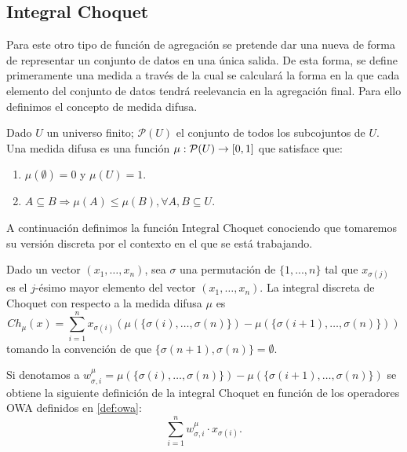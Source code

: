 \subsection{Integral Choquet}
Para este otro tipo de función \cite{art:choquet, art:sugenochoquet} de agregación se pretende dar una nueva de forma de representar un conjunto de datos en una única salida. De esta forma, se define primeramente una medida a través de la cual se calculará la forma en la que cada elemento del conjunto de datos tendrá reelevancia en la agregación final. Para ello definimos el concepto de medida difusa.
\begin{definition}\label{def:medidadifusa}
Dado $U$ un universo finito; $\mathcal{P}(U)$ el conjunto de todos los subcojuntos de $U$. Una medida difusa es una función $\mu:\mathcal{P}(U)\rightarrow[0,1]$ que satisface que:
\begin{enumerate}
	\item $\mu(\emptyset)=0$ y $\mu(U)=1$.
	\item $A\subseteq B \Rightarrow \mu(A)\leq\mu (B), \forall A, B \subseteq U$.
\end{enumerate}
\end{definition}

A continuación definimos la función Integral Choquet conociendo que tomaremos su versión discreta por el contexto en el que se está trabajando.

\begin{definition}\label{def:choquet}
Dado un vector $(x_1,\dots,x_n)$, sea $\sigma$ una permutación de $\{1,...,n\}$ tal que $x_{\sigma(j)}$ es el $j$-ésimo mayor elemento del vector $(x_{1},\dots,x_{n})$. La integral discreta de Choquet con respecto a la medida difusa $\mu$ es 
$$Ch_{\mu}(x)=\sum_{i=1}^{n}x_{\sigma(i)}(\mu(\{\sigma(i),\dots,\sigma(n)\})-\mu(\{\sigma(i+1),\dots,\sigma(n)\}))$$
tomando la convención de que $\{\sigma(n+1),\sigma(n)\}=\emptyset$.
\end{definition}

\begin{proposition}\label{prop:choque2owa}
Si denotamos a $w_{\sigma, i}^{\mu} = \mu(\{\sigma(i),\dots,\sigma(n)\})-\mu(\{\sigma(i+1),\dots,\sigma(n)\})$ se obtiene la siguiente definición de la integral Choquet en función de los operadores OWA definidos en \ref{def:owa}:
$$\sum_{i=1}^{n} w_{\sigma, i}^{\mu} \cdot x_{\sigma(i)}.$$
\end{proposition}


